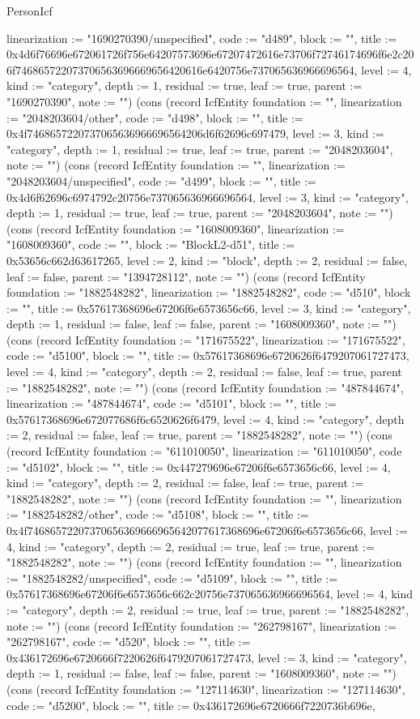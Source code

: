 \begin{lexlean}{PersonIcf}
\begin{semanticmodule}
{linearization := "1690270390/unspecified", code := "d489", block := "", title := 0x4d6f76696e672061726f756e64207573696e67207472616e73706f72746174696f6e2c206f746865722073706563696669656420616e6420756e737065636966696564, level := 4, kind := "category", depth := 1, residual := true, leaf := true, parent := "1690270390", note := ""}) (cons (record IcfEntity {foundation := "", linearization := "2048203604/other", code := "d498", block := "", title := 0x4f7468657220737065636966696564206d6f62696c697479, level := 3, kind := "category", depth := 1, residual := true, leaf := true, parent := "2048203604", note := ""}) (cons (record IcfEntity {foundation := "", linearization := "2048203604/unspecified", code := "d499", block := "", title := 0x4d6f62696c6974792c20756e737065636966696564, level := 3, kind := "category", depth := 1, residual := true, leaf := true, parent := "2048203604", note := ""}) (cons (record IcfEntity {foundation := "1608009360", linearization := "1608009360", code := "", block := "BlockL2-d51", title := 0x53656c662d63617265, level := 2, kind := "block", depth := 2, residual := false, leaf := false, parent := "1394728112", note := ""}) (cons (record IcfEntity {foundation := "1882548282", linearization := "1882548282", code := "d510", block := "", title := 0x57617368696e67206f6e6573656c66, level := 3, kind := "category", depth := 1, residual := false, leaf := false, parent := "1608009360", note := ""}) (cons (record IcfEntity {foundation := "171675522", linearization := "171675522", code := "d5100", block := "", title := 0x57617368696e6720626f6479207061727473, level := 4, kind := "category", depth := 2, residual := false, leaf := true, parent := "1882548282", note := ""}) (cons (record IcfEntity {foundation := "487844674", linearization := "487844674", code := "d5101", block := "", title := 0x57617368696e672077686f6c6520626f6479, level := 4, kind := "category", depth := 2, residual := false, leaf := true, parent := "1882548282", note := ""}) (cons (record IcfEntity {foundation := "611010050", linearization := "611010050", code := "d5102", block := "", title := 0x447279696e67206f6e6573656c66, level := 4, kind := "category", depth := 2, residual := false, leaf := true, parent := "1882548282", note := ""}) (cons (record IcfEntity {foundation := "", linearization := "1882548282/other", code := "d5108", block := "", title := 0x4f74686572207370656369666965642077617368696e67206f6e6573656c66, level := 4, kind := "category", depth := 2, residual := true, leaf := true, parent := "1882548282", note := ""}) (cons (record IcfEntity {foundation := "", linearization := "1882548282/unspecified", code := "d5109", block := "", title := 0x57617368696e67206f6e6573656c662c20756e737065636966696564, level := 4, kind := "category", depth := 2, residual := true, leaf := true, parent := "1882548282", note := ""}) (cons (record IcfEntity {foundation := "262798167", linearization := "262798167", code := "d520", block := "", title := 0x436172696e6720666f7220626f6479207061727473, level := 3, kind := "category", depth := 1, residual := false, leaf := false, parent := "1608009360", note := ""}) (cons (record IcfEntity {foundation := "127114630", linearization := "127114630", code := "d5200", block := "", title := 0x436172696e6720666f7220736b696e, }
\end{semanticmodule}
\end{lexlean}
